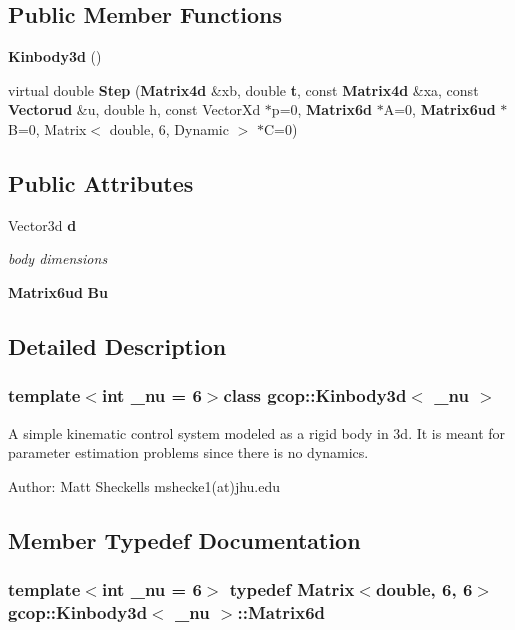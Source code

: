 \subsection*{\-Public \-Member \-Functions}
\begin{DoxyCompactItemize}
\item 
{\bf \-Kinbody3d} ()
\item 
virtual double {\bf \-Step} ({\bf \-Matrix4d} \&xb, double {\bf t}, const {\bf \-Matrix4d} \&xa, const {\bf \-Vectorud} \&u, double h, const \-Vector\-Xd $\ast$p=0, {\bf \-Matrix6d} $\ast$\-A=0, {\bf \-Matrix6ud} $\ast$\-B=0, \-Matrix$<$ double, 6, \-Dynamic $>$ $\ast$\-C=0)
\end{DoxyCompactItemize}
\subsection*{\-Public \-Attributes}
\begin{DoxyCompactItemize}
\item 
\-Vector3d {\bf d}
\begin{DoxyCompactList}\small\item\em body dimensions \end{DoxyCompactList}\item 
{\bf \-Matrix6ud} {\bf \-Bu}
\end{DoxyCompactItemize}


\subsection{\-Detailed \-Description}
\subsubsection*{template$<$int \-\_\-nu = 6$>$class gcop\-::\-Kinbody3d$<$ \-\_\-nu $>$}

\-A simple kinematic control system modeled as a rigid body in 3d. \-It is meant for parameter estimation problems since there is no dynamics.

\-Author\-: \-Matt \-Sheckells mshecke1(at)jhu.\-edu 

\subsection{\-Member \-Typedef \-Documentation}
\subsubsection[{\-Matrix6d}]{\setlength{\rightskip}{0pt plus 5cm}template$<$int \-\_\-nu = 6$>$ typedef \-Matrix$<$double, 6, 6$>$ {\bf gcop\-::\-Kinbody3d}$<$ \-\_\-nu $>$\-::{\bf \-Matrix6d}}\label{classgcop_1_1Kinbody3d_a2be7b2a1c078d4582cfa0cc8b578c4c4}
